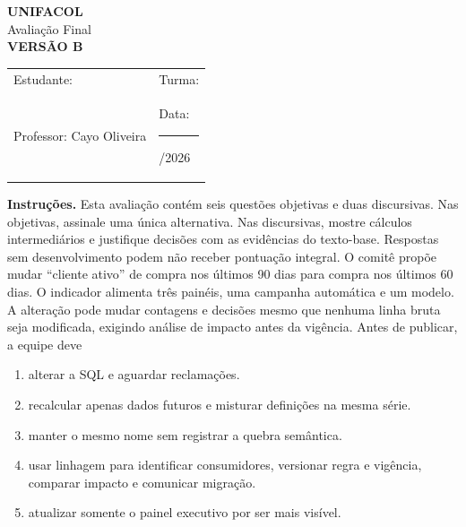 \documentclass[12pt,a4paper]{article}
\begin{document}
\begin{center}
{\Large\bfseries UNIFACOL}\\[2mm]
{\large Avaliação Final}\\[1mm]
{\Large\bfseries VERSÃO B}
\end{center}
\begin{DocumentBox}[Identificação]
\begin{tabularx}{\textwidth}{@{}p{}p{}@{}}
Estudante: \hrulefill & Turma: \hrulefill\\[3mm]
Professor: Cayo Oliveira & Data: \rule{2.7cm}{.2pt}/2026
\end{tabularx}
\end{DocumentBox}
\textbf{Instruções.} Esta avaliação contém seis questões objetivas e duas discursivas. Nas objetivas, assinale uma única alternativa. Nas discursivas, mostre cálculos intermediários e justifique decisões com as evidências do texto-base. Respostas sem desenvolvimento podem não receber pontuação integral.
\bigskip
\TextoBase O comitê propõe mudar ``cliente ativo'' de compra nos últimos 90 dias para compra nos últimos 60 dias. O indicador alimenta três painéis, uma campanha automática e um modelo. A alteração pode mudar contagens e decisões mesmo que nenhuma linha bruta seja modificada, exigindo análise de impacto antes da vigência.
\FonteDidatica
\Comando Antes de publicar, a equipe deve
\begin{enumerate}[label=\Alph*)]
  \item alterar a SQL e aguardar reclamações.
  \item recalcular apenas dados futuros e misturar definições na mesma série.
  \item manter o mesmo nome sem registrar a quebra semântica.
  \item usar linhagem para identificar consumidores, versionar regra e vigência, comparar impacto e comunicar migração.
  \item atualizar somente o painel executivo por ser mais visível.
\end{enumerate}
\end{document}
